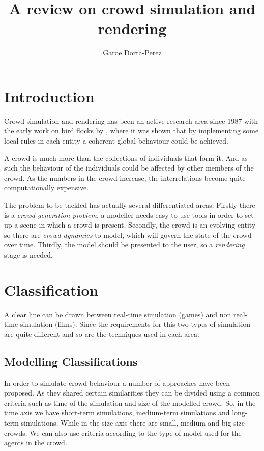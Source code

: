 \documentclass[conference]{acmsiggraph}
\title{A review on crowd simulation and rendering}
\author{Garoe Dorta-Perez}
\begin{document}
\maketitle


\section{Introduction}

Crowd simulation and rendering has been an active research area since 1987 
with the early work on bird flocks by \cite{Reynolds1987}, where it was
shown that by implementing some local rules in each entity a coherent
global behaviour could be achieved.
 
A crowd is much more than the collections of individuals
that form it. And as such the behaviour of the individuals could be
affected by other members of the crowd. As the numbers in the crowd
increase, the interrelations become quite computationally expensive.

The problem to be tackled has actually several differentiated areas. Firstly
there is a \textit{crowd generation problem}, a modeller needs easy to
use tools in order to set up a scene in which a crowd is present. Secondly,
the crowd is an evolving entity so there are \textit{crowd dynamics} to model,
which will govern the state of the crowd over time. Thirdly, the model should
be presented to the user, so a \textit{rendering} stage is needed.

\section{Classification}

A clear line can be drawn between real-time simulation (games)
and non real-time simulation (films). Since the requirements for this two types of simulation
are quite different and so are the techniques used in each area.

\subsection{Modelling Classifications}

In order to simulate crowd behaviour a number of approaches have been
proposed. As they shared certain similarities they can be divided 
using a common criteria such as time of the simulation and size
of the modelled crowd. So, in the time
axis we have short-term simulations, medium-term simulations and
long-term simulations. While in the size axis there are small,
medium and big size crowds. We can also use criteria according to
the type of model used for the agents in the crowd.
\end{document}
